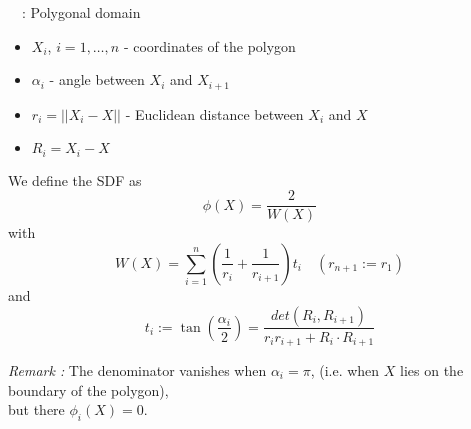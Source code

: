 \begin{frame}{\appendixname~\theappendixframenumber~: Polygonal domain \cite{sukumar_exact_2022}}
	\begin{minipage}{0.68\linewidth}
		\begin{itemize}[]
			\item $X_i$, $i=1,\dots,n$ - coordinates of the polygon
			\item $\alpha_i$ - angle between $X_i$ and $X_{i+1}$
			\item $r_i=||X_i-X||$ - Euclidean distance between $X_i$ and $X$ \\
			\item $R_i=X_i-X$
		\end{itemize}
	\end{minipage}
	\begin{minipage}{0.28\linewidth}
		\centering
	\end{minipage}
	\vspace{-10pt}
	We define the SDF as 
	\begin{equation*}
		\phi(X)=\frac{2}{W(X)}
	\end{equation*}
	with
	\begin{equation*}
		W(X)=\sum_{i=1}^{n}\left(\frac{1}{r_i}+\frac{1}{r_{i+1}}\right)t_i \quad (r_{n+1}:=r_1)
	\end{equation*}
	and 
	\begin{equation*}
		t_i:=\tan\left(\frac{\alpha_i}{2}\right)=\frac{det(R_i,R_{i+1})}{r_ir_{i+1}+R_i\cdot R_{i+1}}
	\end{equation*}

	\footnotesize
	\textit{Remark :} The denominator vanishes when $\alpha_i=\pi$, (i.e. when $X$ lies on the boundary of the polygon), \\ but there $\phi_i(X)=0$.
\end{frame}
\addtocounter{appendixframenumber}{1}

